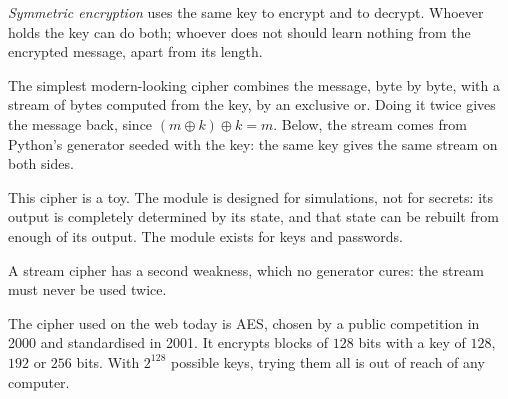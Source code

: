 \begin{definition}\label{def:g12:secure-communication:symmetric}
\emph{Symmetric encryption} uses the same key to encrypt and to decrypt. Whoever holds the
key can do both; whoever does not should learn nothing from the encrypted message, apart from its length.
\end{definition}

The simplest modern-looking cipher combines the message, byte by byte, with a stream of bytes computed from the key,
by an exclusive or. Doing it twice gives the message back, since $(m \oplus k) \oplus k = m$. Below, the stream comes
from Python's  generator seeded with the key: the same key gives the same stream on both sides.

\label{lst:g12:secure-communication:xor}

\label{out:g12:secure-communication:xor}

This cipher is a toy. The  module is designed for simulations, not for secrets: its output is completely
determined by its state, and that state can be rebuilt from enough of its output. The module  exists
for keys and passwords.

A stream cipher has a second weakness, which no generator cures: the stream must never be used twice.

\label{lst:g12:secure-communication:reuse}

\label{out:g12:secure-communication:reuse}

\begin{inpractice}
The cipher used on the web today is AES, chosen by a public competition in 2000 and standardised in 2001. It
encrypts blocks of $128$ bits with a key of $128$, $192$ or $256$ bits. With $2^{128}$ possible keys, trying them
all is out of reach of any computer.
\end{inpractice}

